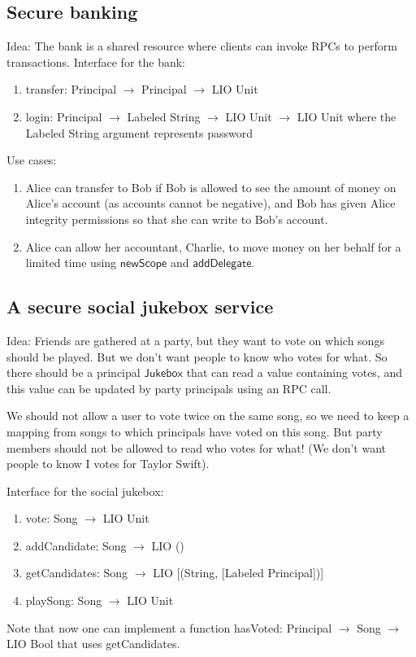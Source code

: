 \documentclass[conference]{IEEEtran}
\begin{document}
\subsection{Secure banking}
Idea: The bank is a shared resource where clients can invoke RPCs to perform transactions.
Interface for the bank:
\begin{enumerate}
    \item \textsf{transfer: Principal $\rightarrow$ Principal $\rightarrow$ LIO Unit}
    \item \textsf{login: Principal $\rightarrow$ Labeled String $\rightarrow$ LIO Unit $\rightarrow$ LIO Unit} where the Labeled String argument represents password
\end{enumerate}
Use cases:
\begin{enumerate}
    \item Alice can transfer to Bob if Bob is allowed to see the amount of money on Alice's account (as accounts cannot be negative), and Bob has given Alice integrity permissions so that she can write to Bob's account. 
    \item Alice can allow her accountant, Charlie, to move money on her behalf for a limited time using $\mathsf{newScope}$ and $\mathsf{addDelegate}$.
\end{enumerate}

\subsection{A secure social jukebox service}
Idea: Friends are gathered at a party, but they want to vote on which songs should be played. But we don't want people to know who votes for what. So there should be a principal $\mathsf{Jukebox}$ that can read a value containing votes, and this value can be updated by party principals using an RPC call.

We should not allow a user to vote twice on the same song, so we need to keep a mapping from songs to which principals have voted on this song. But party members should not be allowed to read who votes for what! (We don't want people to know I votes for Taylor Swift).

Interface for the social jukebox:
\begin{enumerate}
    \item \textsf{vote: Song $\rightarrow$ LIO Unit}
    \item \textsf{addCandidate: Song $\rightarrow$ LIO ()}
    \item \textsf{getCandidates: Song $\rightarrow$ LIO [(String, [Labeled Principal])]}
    \item \textsf{playSong: Song $\rightarrow$ LIO Unit}
\end{enumerate}
Note that now one can implement a function \textsf{hasVoted: Principal $\rightarrow$ Song $\rightarrow$ LIO Bool} that uses \textsf{getCandidates}.
\end{document}
